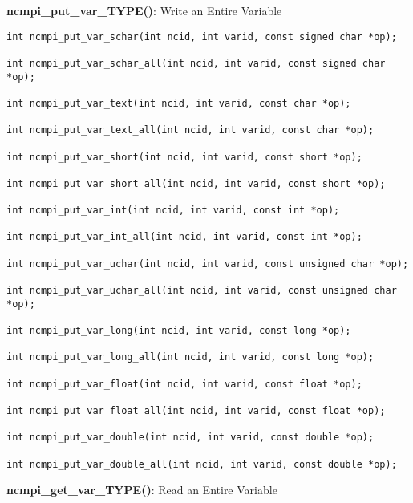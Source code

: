 {\bf ncmpi\_put\_var\_TYPE()}: Write an Entire Variable

\begin{verbatim}
int ncmpi_put_var_schar(int ncid, int varid, const signed char *op);

int ncmpi_put_var_schar_all(int ncid, int varid, const signed char *op);

int ncmpi_put_var_text(int ncid, int varid, const char *op);

int ncmpi_put_var_text_all(int ncid, int varid, const char *op);

int ncmpi_put_var_short(int ncid, int varid, const short *op);

int ncmpi_put_var_short_all(int ncid, int varid, const short *op);

int ncmpi_put_var_int(int ncid, int varid, const int *op);

int ncmpi_put_var_int_all(int ncid, int varid, const int *op);

int ncmpi_put_var_uchar(int ncid, int varid, const unsigned char *op);

int ncmpi_put_var_uchar_all(int ncid, int varid, const unsigned char *op);

int ncmpi_put_var_long(int ncid, int varid, const long *op);

int ncmpi_put_var_long_all(int ncid, int varid, const long *op);

int ncmpi_put_var_float(int ncid, int varid, const float *op);

int ncmpi_put_var_float_all(int ncid, int varid, const float *op);

int ncmpi_put_var_double(int ncid, int varid, const double *op);

int ncmpi_put_var_double_all(int ncid, int varid, const double *op);

\end{verbatim}


{\bf ncmpi\_get\_var\_TYPE()}: Read an Entire Variable

